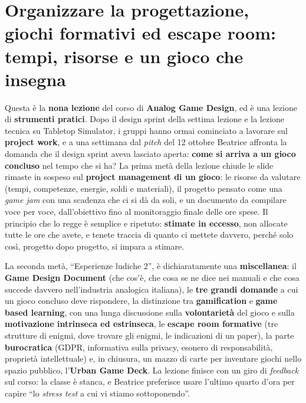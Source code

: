 \chapter[Organizzare la progettazione e giochi formativi]{Organizzare la
progettazione, giochi formativi ed escape room: tempi, risorse e un gioco che
insegna}
\label{a9:cap:pm}

Questa è la \textbf{nona lezione} del corso di \textbf{Analog Game Design}, ed è una
lezione di \textbf{strumenti pratici}. Dopo il design sprint della settima lezione e
la lezione tecnica su Tabletop Simulator, i gruppi hanno ormai cominciato a lavorare
sul \textbf{project work}, e a una settimana dal \emph{pitch} del 12 ottobre Beatrice
affronta la domanda che il design sprint aveva lasciato aperta: \textbf{come si
arriva a un gioco concluso} nel tempo che si ha? La prima metà della lezione chiude le
slide rimaste in sospeso sul \textbf{project management di un gioco}: le risorse da
valutare (tempi, competenze, energie, soldi e materiali), il progetto pensato come
una \emph{game jam} con una scadenza che ci si dà da soli, e un documento da
compilare voce per voce, dall'obiettivo fino al monitoraggio finale delle ore spese.
Il principio che lo regge è semplice e ripetuto: \textbf{stimate in eccesso}, non
allocate tutte le ore che avete, e tenete traccia di quanto ci mettete davvero,
perché solo così, progetto dopo progetto, si impara a stimare.

La seconda metà, ``Esperienze ludiche 2'', è dichiaratamente una
\textbf{miscellanea}: il \textbf{Game Design Document} (che cos'è, che cosa se ne
dice nei manuali e che cosa succede davvero nell'industria analogica italiana), le
\textbf{tre grandi domande} a cui un gioco concluso deve rispondere, la distinzione
tra \textbf{gamification} e \textbf{game based learning}, con una lunga discussione
sulla \textbf{volontarietà} del gioco e sulla \textbf{motivazione intrinseca ed
estrinseca}, le \textbf{escape room formative} (tre strutture di enigmi, dove trovare
gli enigmi, le indicazioni di un paper), la parte \textbf{burocratica} (GDPR,
informativa sulla privacy, esonero di responsabilità, proprietà intellettuale) e, in
chiusura, un mazzo di carte per inventare giochi nello spazio pubblico, l'\textbf{Urban
Game Deck}. La lezione finisce con un giro di \emph{feedback} sul corso: la classe è
stanca, e Beatrice preferisce usare l'ultimo quarto d'ora per capire ``lo
\emph{stress test} a cui vi stiamo sottoponendo''.

